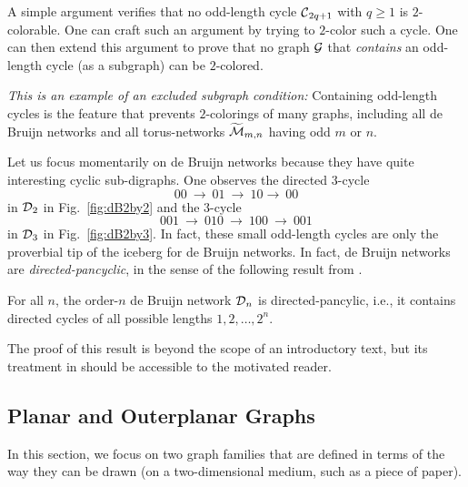 A simple argument verifies that no odd-length cycle $\mbox{$\cal C$}_{2q+1}$ with $q \geq 1$ is $2$-colorable.  One can craft such an argument by trying to $2$-color such a cycle.  One can then extend this argument to prove that no graph $\mbox{$\cal G$}$ that {\em contains} an odd-length cycle (as a subgraph) can be $2$-colored.

\smallskip

{\em This is an example of an {\em excluded subgraph} condition:}  Containing odd-length cycles is the feature that prevents $2$-colorings of many graphs, including all de Bruijn networks and all torus-networks $\widetilde{\mbox{$\cal M$}}_{m,n}$ having odd $m$ or $n$.


\smallskip

Let us focus momentarily on de Bruijn networks because they have quite interesting cyclic sub-digraphs.  One observes the directed $3$-cycle
\[ 00 \ \rightarrow \ 01 \ \rightarrow \ 10  \rightarrow \ 00 \]
in $\mbox{$\cal D$}_2$ in Fig.~\ref{fig:dB2by2} and the $3$-cycle
\[ 001 \ \rightarrow \ 010 \ \rightarrow \ 100 \ \rightarrow \ 001 \]
in $\mbox{$\cal D$}_3$ in Fig.~\ref{fig:dB2by3}.  In fact, these small odd-length cycles are only the proverbial tip of the iceberg for de Bruijn networks.  In fact, de Bruijn networks are {\it directed-pancyclic}, in the sense of the following result from \cite{Yoeli62}.

  

\begin{prop}
\label{thm:DB-pancyclic}
For all $n$, the order-$n$ de Bruijn network $\mbox{$\cal D$}_n$ is directed-pancylic, i.e., it contains directed cycles of all possible lengths $1, 2, \ldots, 2^n$.
\end{prop}

The proof of this result is beyond the scope of an introductory text, but its treatment in \cite{Yoeli62} should be accessible to the motivated reader.

\subsection{Planar and Outerplanar Graphs}
\label{sec:planar+outerplanar-color}
 
 

In this section, we focus on two graph families that are defined in terms of the way they can be drawn (on a two-dimensional medium, such as a piece of paper).

